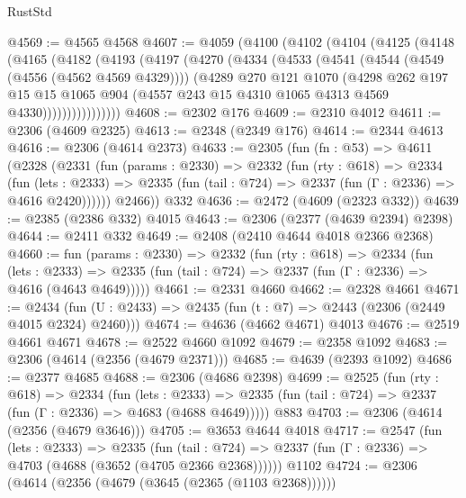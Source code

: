 \begin{lexlean}{RustStd}
\begin{coremodule}
@4569 := @4565 @4568
@4607 := @4059
    (@4100
      (@4102
        (@4104
          (@4125
            (@4148
              (@4165
                (@4182
                  (@4193
                    (@4197
                      (@4270
                        (@4334
                          (@4533
                            (@4541
                              (@4544 (@4549 (@4556 (@4562 @4569 @4329))))
                              (@4289
                                @270
                                @121
                                @1070
                                (@4298
                                  @262
                                  @197
                                  @15
                                  @15
                                  @1065
                                  @904
                                  (@4557 @243 @15 @4310 @1065 @4313 @4569 @4330))))))))))))))))
@4608 := @2302 @176
@4609 := @2310 @4012
@4611 := @2306 (@4609 @2325)
@4613 := @2348 (@2349 @176)
@4614 := @2344 @4613
@4616 := @2306 (@4614 @2373)
@4633 := @2305
    (fun (fn : @53) =>
    @4611
      (@2328
        (@2331
          (fun (params : @2330) =>
          @2332
            (fun (rty : @618) =>
            @2334
              (fun (lets : @2333) =>
              @2335 (fun (tail : @724) => @2337 (fun (Γ : @2336) => @4616 @2420))))))
        @2466))
    @332
@4636 := @2472 (@4609 (@2323 @332))
@4639 := @2385 (@2386 @332) @4015
@4643 := @2306 (@2377 (@4639 @2394) @2398)
@4644 := @2411 @332
@4649 := @2408 (@2410 @4644 @4018 @2366 @2368)
@4660 := fun (params : @2330) =>
  @2332
    (fun (rty : @618) =>
    @2334
      (fun (lets : @2333) =>
      @2335 (fun (tail : @724) => @2337 (fun (Γ : @2336) => @4616 (@4643 @4649)))))
@4661 := @2331 @4660
@4662 := @2328 @4661
@4671 := @2434 (fun (U : @2433) => @2435 (fun (t : @7) => @2443 (@2306 (@2449 @4015 @2324) @2460)))
@4674 := @4636 (@4662 @4671) @4013
@4676 := @2519 @4661 @4671
@4678 := @2522 @4660 @1092
@4679 := @2358 @1092
@4683 := @2306 (@4614 (@2356 (@4679 @2371)))
@4685 := @4639 (@2393 @1092)
@4686 := @2377 @4685
@4688 := @2306 (@4686 @2398)
@4699 := @2525
    (fun (rty : @618) =>
    @2334
      (fun (lets : @2333) =>
      @2335 (fun (tail : @724) => @2337 (fun (Γ : @2336) => @4683 (@4688 @4649)))))
    @883
@4703 := @2306 (@4614 (@2356 (@4679 @3646)))
@4705 := @3653 @4644 @4018
@4717 := @2547
    (fun (lets : @2333) =>
    @2335
      (fun (tail : @724) => @2337 (fun (Γ : @2336) => @4703 (@4688 (@3652 (@4705 @2366 @2368))))))
    @1102
@4724 := @2306 (@4614 (@2356 (@4679 (@3645 (@2365 (@1103 @2368))))))

\end{coremodule}
\end{lexlean}
